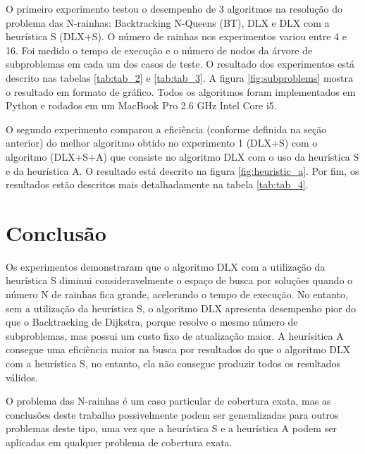 \documentclass{article}
\begin{document}
O primeiro experimento testou o desempenho de 3 algoritmos na resolução do problema das N-rainhas: Backtracking N-Queens (BT),
DLX e DLX com a heurística S (DLX+S). O número de rainhas nos experimentos variou entre 4 e 16. Foi medido o tempo de execução
e o número de nodos da árvore de subproblemas em cada um dos casos de teste. O resultado dos experimentos está descrito nas tabelas
\ref{tab:tab_2} e \ref{tab:tab_3}. A figura \ref{fig:subproblems} mostra o resultado em formato de gráfico.
Todos os algoritmos foram implementados em Python e rodados em um MacBook Pro 2.6 GHz Intel Core i5.

O segundo experimento comparou a eficiência (conforme definida na seção anterior) do melhor algoritmo obtido no experimento 
1 (DLX+S) com o algoritmo (DLX+S+A) que consiste no algoritmo DLX com o uso da heurística S e da heurística A. O resultado
está descrito na figura \ref{fig:heuristic_a}. Por fim, os resultados estão descritos mais detalhadamente na tabela \ref{tab:tab_4}.

\section{Conclusão}

Os experimentos demonstraram que o algoritmo DLX com a utilização da heurística S diminui consideravelmente
o espaço de busca por soluções quando o número N de rainhas fica grande, acelerando o tempo de execução.
No entanto, sem a utilização da heurística S, o algoritmo DLX apresenta desempenho pior do que o 
Backtracking de Dijkstra, porque resolve o mesmo número de subproblemas, mas possui um custo fixo de atualização maior.
A heurísitica A consegue uma eficiência maior na busca por resultados do que o algoritmo DLX com a heurística S, no 
entanto, ela não consegue produzir todos os resultados válidos.

O problema das N-rainhas é um caso particular de cobertura exata, mas as conclusões deste trabalho possivelmente 
podem ser generalizadas para outros problemas deste tipo, uma vez que a heurística S e a heurística A podem ser aplicadas em 
qualquer problema de cobertura exata.

 

\end{document}
